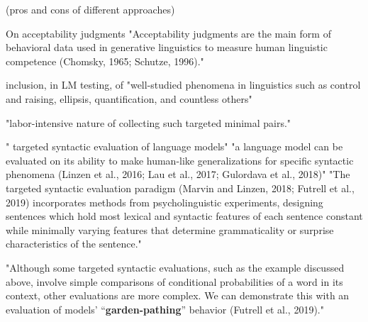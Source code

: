 (pros and cons of different approaches)


On acceptability judgments
"Acceptability judgments are the main form of
behavioral data used in generative linguistics to
measure human linguistic competence (Chomsky,
1965; Schutze, 1996)." \citep{warstadt2020blimp}	

inclusion, in LM testing, of "well-studied phenomena in linguistics such as control and
raising, ellipsis, quantification, and countless others"  \citep{warstadt2020blimp}	

"labor-intensive nature of collecting such targeted minimal pairs." \citep{warstadt2020blimp}	


" targeted syntactic evaluation of language models" \citep{marvin2018targeted}
"a language model can be evaluated on its ability to make human-like generalizations for specific syntactic phenomena (Linzen et al., 2016; Lau et al., 2017; Gulordava et al., 2018)"  \citep{hu2020systematic}
"The targeted syntactic evaluation paradigm (Marvin and Linzen, 2018; Futrell et al., 2019) incorporates methods from psycholinguistic experiments,
designing sentences which hold most lexical and syntactic features of each sentence constant while minimally varying features that determine grammaticality or surprise characteristics of the sentence."  \citep{hu2020systematic}


"Although some targeted syntactic evaluations, such as the example discussed above, involve simple comparisons of conditional probabilities of a word in its context, other evaluations are more complex. We can demonstrate this with an evaluation of models’ “\textbf{garden-pathing}” behavior (Futrell et al., 2019)." \citep{hu2020systematic}


